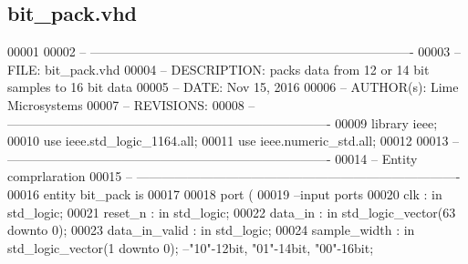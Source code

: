 \subsection{bit\+\_\+pack.\+vhd}
\label{bit__pack_2synth_2bit__pack_8vhd_source}

\begin{DoxyCode}
00001 
00002 \textcolor{keyword}{-- ---------------------------------------------------------------------------- }
00003 \textcolor{keyword}{-- FILE:    bit\_pack.vhd}
00004 \textcolor{keyword}{-- DESCRIPTION: packs data from 12 or 14 bit samples to 16 bit data}
00005 \textcolor{keyword}{-- DATE:    Nov 15, 2016}
00006 \textcolor{keyword}{-- AUTHOR(s):   Lime Microsystems}
00007 \textcolor{keyword}{-- REVISIONS:}
00008 \textcolor{keyword}{-- ---------------------------------------------------------------------------- }
00009 \textcolor{vhdlkeyword}{library }\textcolor{keywordflow}{ieee};
00010 \textcolor{vhdlkeyword}{use }ieee.std\_logic\_1164.\textcolor{keywordflow}{all};
00011 \textcolor{vhdlkeyword}{use }ieee.numeric\_std.\textcolor{keywordflow}{all};
00012 
00013 \textcolor{keyword}{-- ----------------------------------------------------------------------------}
00014 \textcolor{keyword}{-- Entity comprlaration}
00015 \textcolor{keyword}{-- ----------------------------------------------------------------------------}
00016 \textcolor{keywordflow}{entity }bit_pack \textcolor{keywordflow}{is}
00017 
00018   \textcolor{keywordflow}{port} \textcolor{vhdlchar}{(}
00019 \textcolor{keyword}{        --input ports }
00020         \textcolor{vhdlchar}{clk}             \textcolor{vhdlchar}{:} \textcolor{keywordflow}{in} \textcolor{comment}{std\_logic};
00021         \textcolor{vhdlchar}{reset_n}         \textcolor{vhdlchar}{:} \textcolor{keywordflow}{in} \textcolor{comment}{std\_logic};
00022         \textcolor{vhdlchar}{data_in}         \textcolor{vhdlchar}{:} \textcolor{keywordflow}{in} \textcolor{comment}{std\_logic\_vector}\textcolor{vhdlchar}{(}\textcolor{vhdllogic}{}\textcolor{vhdllogic}{63} \textcolor{keywordflow}{downto} \textcolor{vhdllogic}{}\textcolor{vhdllogic}{0}\textcolor{vhdlchar}{)};
00023         \textcolor{vhdlchar}{data_in_valid}   \textcolor{vhdlchar}{:} \textcolor{keywordflow}{in} \textcolor{comment}{std\_logic};
00024         \textcolor{vhdlchar}{sample_width}    \textcolor{vhdlchar}{:} \textcolor{keywordflow}{in} \textcolor{comment}{std\_logic\_vector}\textcolor{vhdlchar}{(}\textcolor{vhdllogic}{}\textcolor{vhdllogic}{1} \textcolor{keywordflow}{downto} \textcolor{vhdllogic}{}\textcolor{vhdllogic}{0}\textcolor{vhdlchar}{)};\textcolor{keyword}{ --"10"-12bit, "01"-14bit, "00"-16bit;}

\end{DoxyCode}
